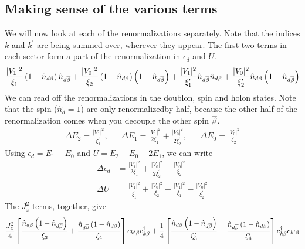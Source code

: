 \documentclass[12pt,twoside]{article}
\numberwithin{equation}{section}
\begin{document}
\subsection{Making sense of the various terms}
We will now look at each of the renormalizations separately. Note that the indices \(k\) and \(k^\prime\) are being summed over, wherever they appear. The first two terms in each sector form a part of the renormalization in \(\epsilon_d\) and \(U\).
\begin{equation}\begin{aligned}
\frac{|V_1|^2}{\xi_1}\left( 1 - \hat n_{d\beta} \right) \hat n_{d\overline\beta} + \frac{|V_0|^2}{\xi_2}\left( 1 - \hat n_{d\beta} \right) \left( 1 - \hat n_{d\overline\beta} \right) + \frac{|V_1|^2}{\xi^\prime_1}\hat n_{d\overline\beta}\hat n_{d\beta} + \frac{|V_0|^2}{\xi^\prime_2}\hat n_{d\beta}\left(1 - \hat n_{d\overline\beta}\right)
\end{aligned}\end{equation}
We can read off the renormalizations in the doublon, spin and holon states. Note that the spin (\(\hat n_{d}=1\)) are only renormalizedby half, because the other half of the renormalization comes when you decouple the other spin \(\overline\beta\).
\begin{equation}\begin{aligned}
	\Delta E_2 = \frac{|V_1|^2}{\xi^\prime_1}, && \Delta E_1 =\frac{|V_1|^2}{2\xi_1} + \frac{|V_0|^2}{2\xi_2^\prime}, && \Delta E_0 = \frac{|V_0|^2}{\xi_2}
\end{aligned}\end{equation}
Using \(\epsilon_d = E_1 - E_0\) and \(U = E_2 + E_0 - 2E_1\), we can write
\begin{equation}\begin{aligned}
	\label{edU}
	\Delta \epsilon_d &= \frac{|V_1|^2}{2\xi_1} + \frac{|V_0|^2}{2\xi_2^\prime} - \frac{|V_0|^2}{\xi_2}\\
	\Delta U &= \frac{|V_1|^2}{\xi_1^\prime} + \frac{|V_0|^2}{\xi_2} - \frac{|V_1|^2}{\xi_1} - \frac{|V_0|^2}{\xi_2^\prime}
\end{aligned}\end{equation}
The \(J_z^2\) terms, together, give
\begin{equation}\begin{aligned}
\frac{J_z^2}{4}\left[\frac{\hat n_{d\beta}\left( 1 - \hat n_{d\overline\beta} \right) }{\xi_3} + \frac{\hat n_{d\overline\beta}\left( 1 - \hat n_{d\beta} \right)}{\xi_4} \right]c_{k^\prime\beta}c^\dagger_{k\beta} +\frac{1}{4}\left[ \frac{\hat n_{d\beta}\left( 1 - \hat n_{d\overline\beta} \right) }{\xi^\prime_3} + \frac{\hat n_{d\overline\beta}\left( 1 - \hat n_{d\beta} \right)}{\xi^\prime_4} \right]c^\dagger_{k\beta}c_{k^\prime\beta}
\end{aligned}\end{equation}
\end{document}
